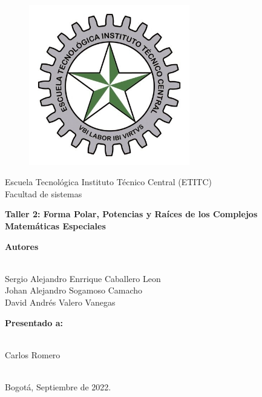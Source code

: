 \documentclass[a4paper,11pt,openany]{book}
\begin{document}
\begin{titlepage}
 
\begin{center}
\vspace*{-1in}
\begin{figure}[htb]
\begin{center}
\includegraphics[width=7cm]{ETITC.png}
\end{center}
\end{figure}
 
 
{\sc \huge Escuela Tecnológica Instituto Técnico Central (ETITC)}\\
\vspace*{0.15in}
Facultad de sistemas\\
\vspace*{0.6in}
\begin{Large}
\textbf{Taller 2: Forma Polar, Potencias y Raíces de los Complejos} \\
\textbf{Matem{\'a}ticas Especiales}\\
\end{Large}
\vspace*{0.3in}
\begin{large}
{\bf Autores} \\
 
\ 
 
Sergio Alejandro Enrrique Caballero Leon\\ 
Johan Alejandro Sogamoso Camacho \\
David Andrés Valero Vanegas \\
\end{large}
\vspace*{0.3in}
 
\end{center}
 
\begin{center}
{\bf Presentado a:} \\
 
\ 
 
Carlos Romero \\
 
\
 
Bogot{\'a}, Septiembre de 2022.
\end{center}
 
\end{titlepage}
\end{document}
